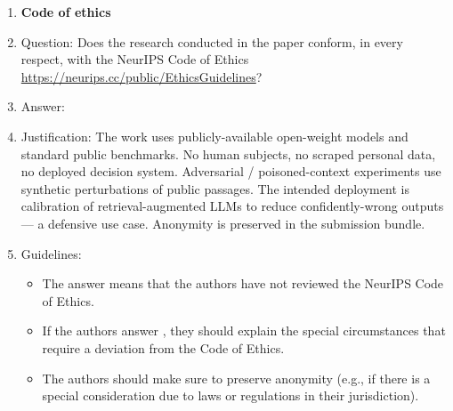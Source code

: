 \begin{enumerate}
\item \textbf{Code of ethics}
    \item[] Question: Does the research conducted in the paper conform, in every respect, with the NeurIPS Code of Ethics \url{https://neurips.cc/public/EthicsGuidelines}?
    \item[] Answer: \answerYes{}
    \item[] Justification: The work uses publicly-available open-weight models and standard public benchmarks. No human subjects, no scraped personal data, no deployed decision system. Adversarial / poisoned-context experiments use synthetic perturbations of public passages. The intended deployment is calibration of retrieval-augmented LLMs to reduce confidently-wrong outputs --- a defensive use case. Anonymity is preserved in the submission bundle.
    \item[] Guidelines:
    \begin{itemize}
        \item The answer \answerNA{} means that the authors have not reviewed the NeurIPS Code of Ethics.
        \item If the authors answer \answerNo{}, they should explain the special circumstances that require a deviation from the Code of Ethics.
        \item The authors should make sure to preserve anonymity (e.g., if there is a special consideration due to laws or regulations in their jurisdiction).
    \end{itemize}


\end{enumerate}
